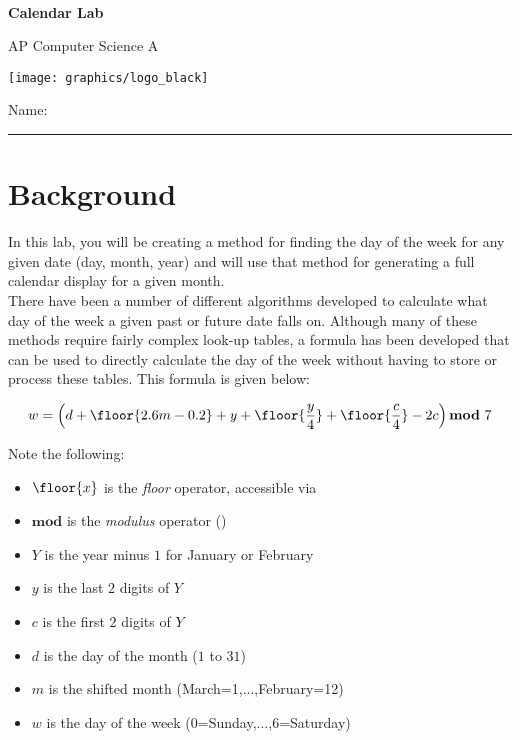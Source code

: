 

\def\LabCourse{AP Computer Science A}
\def\LabNumber{01}
\def\LabTitle{Calendar Lab}


	\begin{coverpages}
		\ \\[2cm]
		\begin{center}
			\huge
			\textbf{\LabTitle}

			\Large
			\LabCourse
		\end{center}

		\vspace{1.5cm}

		\begin{center}
			\texttt{[image: graphics/logo\_black]}

			\vspace{2.5cm}

			\Large
			Name: \rule{11.5cm}{0.1pt}
		\end{center}
	\end{coverpages}

	\thispagestyle{empty}
	\tableofcontents

	\pagebreak

	\section{Background}
		In this lab, you will be creating a method for finding the day of the week for any given date (day, month, year) and will use that method for generating a full calendar display for a given month.\\[\baselineskip]
		There have been a number of different algorithms developed to calculate what day of the week a given past or future date falls on. Although many of these methods require fairly complex look-up tables, a formula has been developed that can be used to directly calculate the day of the week without having to store or process these tables. This formula is given below:

		\[
			w = \left(d + \floor{2.6m - 0.2} + y + \floor{\dfrac{y}{4}} + \floor{\dfrac{c}{4}} - 2c\right) \mathbf{mod}\ 7
		\]

		Note the following:
		\begin{itemize}
			\item $\floor{x}$ is the \emph{floor} operator, accessible via 
			\item $\mathbf{mod}$ is the \emph{modulus} operator (\code{\%})
			\item $Y$ is the year minus $1$ for January or February
			\item $y$ is the last $2$ digits of $Y$
			\item $c$ is the first $2$ digits of $Y$
			\item $d$ is the day of the month ($1$ to $31$)
			\item $m$ is the shifted month (March=1,...,February=12)
			\item $w$ is the day of the week (0=Sunday,...,6=Saturday)
		\end{itemize}

